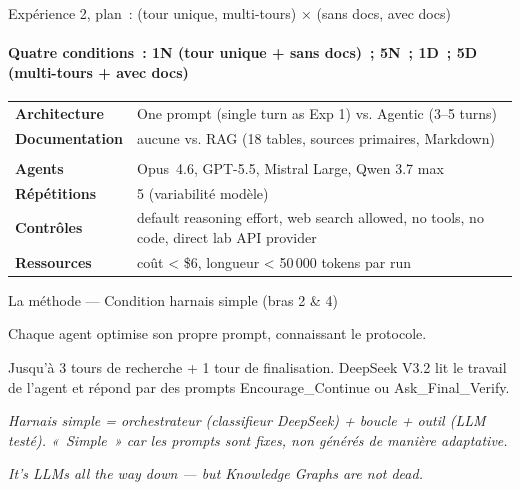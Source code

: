 \documentclass[aspectratio=169]{beamer}
\begin{document}
\begin{frame}{Expérience 2, plan~: (tour unique, multi-tours) × (sans docs, avec docs)}
\framesubtitle{Quatre conditions~: 1N (tour unique + sans docs)~; 5N~; 1D~; 5D (multi-tours + avec docs)}
\begin{center}
\begin{tabular}{@{}l p{8.5cm}@{}}
\textbf{Architecture}     & One prompt (single turn as Exp 1) vs. Agentic (3--5 turns) \\
\textbf{Documentation}    & aucune vs. RAG (18 tables, sources primaires, Markdown) \\
\\
\textbf{Agents}           & Opus~4.6, GPT-5.5, Mistral Large, Qwen 3.7 max \\
\textbf{Répétitions}      & 5 (variabilité modèle) \\
\textbf{Contrôles}        & default reasoning effort, web search allowed, no tools, no code, direct lab API provider \\
\textbf{Ressources}      & coût < \$6, longueur < 50\,000 tokens par run\\
\end{tabular}
\end{center}
\end{frame}

\begin{frame}{La méthode --- Condition harnais simple (bras 2 \& 4)}
\begin{description}\setlength\itemsep{8pt}
  \item[\textbf{Phase A, réflexive}] Chaque agent optimise son propre prompt, connaissant le protocole.
  \item[\textbf{Phase B, scriptée}] Jusqu'à 3 tours de recherche + 1 tour de finalisation. DeepSeek V3.2 lit le travail de l'agent et répond par des prompts Encourage\_Continue ou Ask\_Final\_Verify.
\end{description}

\smallskip
{\small\textit{Harnais simple = orchestrateur (classifieur DeepSeek) + boucle + outil (LLM testé). «~Simple~» car les prompts sont fixes, non générés de manière adaptative.}}

\medskip
\begin{center}
{\small\textit{It's LLMs all the way down --- but Knowledge Graphs are not dead.}}
\end{center}
\end{frame}
\end{document}
